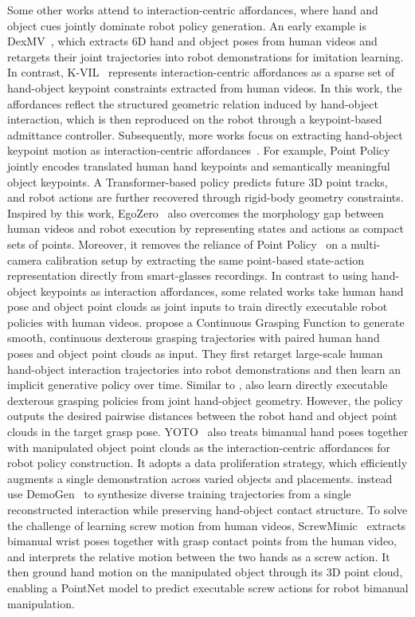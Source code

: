 \documentclass[Afour,sageh,times]{sagej}
\begin{document}
Some other works attend to interaction-centric affordances, where hand and object cues jointly dominate robot policy generation. An early example is DexMV~\citep{qin2022dexmv}, which extracts 6D hand and object poses from human videos and retargets their joint trajectories into robot demonstrations for imitation learning. In contrast, K-VIL~\citep{gao2023k} represents interaction-centric affordances as a sparse set of hand-object keypoint constraints extracted from human videos. In this work, the affordances reflect the structured geometric relation induced by hand-object interaction, which is then reproduced on the robot through a keypoint-based admittance controller. Subsequently, more works focus on extracting hand-object keypoint motion as interaction-centric affordances~\citep{haldar2025point,liu2025egozero,hu2025learning}. For example, Point Policy~\citep{haldar2025point} jointly encodes translated human hand keypoints and semantically meaningful object keypoints. A Transformer-based policy predicts future 3D point tracks, and robot actions are further recovered through rigid-body geometry constraints. Inspired by this work, EgoZero~\citep{liu2025egozero} also overcomes the morphology gap between human videos and robot execution by representing states and actions as compact sets of points. Moreover, it removes the reliance of Point Policy~\citep{haldar2025point} on a multi-camera calibration setup by extracting the same point-based state-action representation directly from smart-glasses recordings. In contrast to using hand-object keypoints as interaction affordances, some related works take human hand pose and object point clouds as joint inputs to train directly executable robot policies with human videos. \cite{ye2023learning} propose a Continuous Grasping Function to generate smooth, continuous dexterous grasping trajectories with paired human hand poses and object point clouds as input. They first retarget large-scale human hand-object interaction trajectories into robot demonstrations and then learn an implicit generative policy over time. Similar to \cite{ye2023learning}, \cite{chen2025web2grasp} also learn directly executable dexterous grasping policies from joint hand-object geometry. However, the policy outputs the desired pairwise distances between the robot hand and object point clouds in the target grasp pose. YOTO~\citep{zhou2025you} also treats bimanual hand poses together with manipulated object point clouds as the interaction-centric affordances for robot policy construction. It adopts a data proliferation strategy, which efficiently augments a single demonstration across varied objects and placements. \cite{chen2026dexterous} instead use DemoGen~\citep{xue2025demogen} to synthesize diverse training trajectories from a single reconstructed interaction while preserving hand-object contact structure. To solve the challenge of learning screw motion from human videos, ScrewMimic~\citep{bahety2024screwmimic} extracts bimanual wrist poses together with grasp contact points from the human video, and interprets the relative motion between the two hands as a screw action. It then ground hand motion on the manipulated object through its 3D point cloud, enabling a PointNet model to predict executable screw actions for robot bimanual manipulation. 
\end{document}
